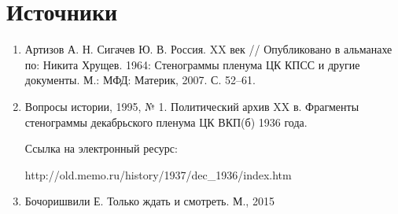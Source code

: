
    \section*{Источники}
      \begin{enumerate}
        \item Артизов А. Н. Сигачев Ю. В. Россия. XX век // Опубликовано в альманахе по: Никита Хрущев. 1964: Стенограммы пленума ЦК КПСС и другие документы. М.: МФД: Материк, 2007. С. 52–61.
        \item Вопросы истории, 1995, № 1. Политический архив XX в. Фрагменты стенограммы декабрьского пленума ЦК ВКП(б) 1936 года.\par Ссылка на электронный ресурс: \par http://old.memo.ru/history/1937/dec\_1936/index.htm
        \item Бочоришвили Е. Только ждать и смотреть. М., 2015
      \end{enumerate}
      
